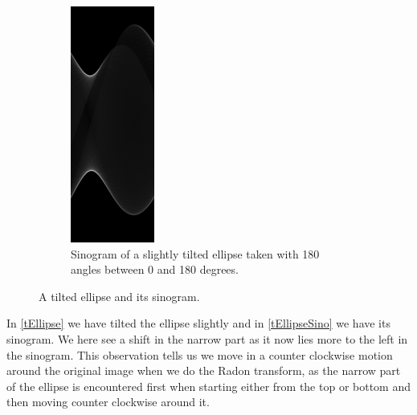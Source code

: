 \begin{figure}
\begin{subfigure}{0.48\linewidth}
		\includegraphics[height=1.5\linewidth]{Materials/tEllipseSino}
		\caption{Sinogram of a slightly tilted ellipse taken with 180 angles between 0 and 180 degrees.}
		\label{tEllipseSino}
	\end{subfigure}
	\caption{A tilted ellipse and its sinogram.}
\end{figure}
In \autoref{tEllipse} we have tilted the ellipse slightly and in \autoref{tEllipseSino} we have its sinogram. We here see a shift in the narrow part as it now lies more to the left in the sinogram. This observation tells us we move in a counter clockwise motion around the original image when we do the Radon transform, as the narrow part of the ellipse is encountered first when starting either from the top or bottom and then moving counter clockwise around it.\\
